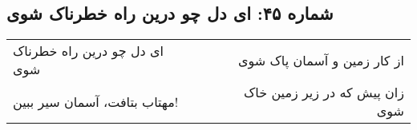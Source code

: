 \begin{center}
\section*{شماره ۴۵: ای دل چو درین راه خطرناک شوی}
\label{sec:045}
\begin{longtable}{l p{0.5cm} r}
ای دل چو درین راه خطرناک شوی
&&
از کار زمین و آسمان پاک شوی
\\
مهتاب بتافت، آسمان سیر ببین!
&&
زان پیش که در زیر زمین خاک شوی
\\
\end{longtable}
\end{center}
